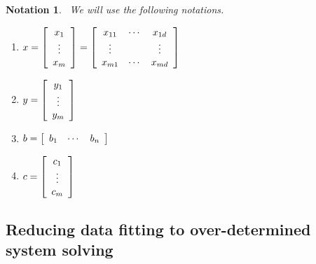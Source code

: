 \documentclass{article}%
\newtheorem{notation}[theorem]{Notation}
\begin{document}
\begin{notation}
\ We will use the following notations.

\begin{enumerate}
\item $x=\left[
\begin{array}
[c]{c}%
x_{1}\\
\vdots\\
x_{m}%
\end{array}
\right]  =\left[
\begin{array}
[c]{ccc}%
x_{11} & \cdots & x_{1d}\\
\vdots &  & \vdots\\
x_{m1} & \cdots & x_{md}%
\end{array}
\right]  $

\item $y=\left[
\begin{array}
[c]{c}%
y_{1}\\
\vdots\\
y_{m}%
\end{array}
\right]  $

\item $b=\left[
\begin{array}
[c]{ccc}%
b_{1} & \cdots & b_{n}%
\end{array}
\right]  $

\item $c=\left[
\begin{array}
[c]{c}%
c_{1}\\
\vdots\\
c_{m}%
\end{array}
\right]  $
\end{enumerate}
\end{notation}

\subsection{Reducing data fitting to over-determined system solving}
\end{document}

